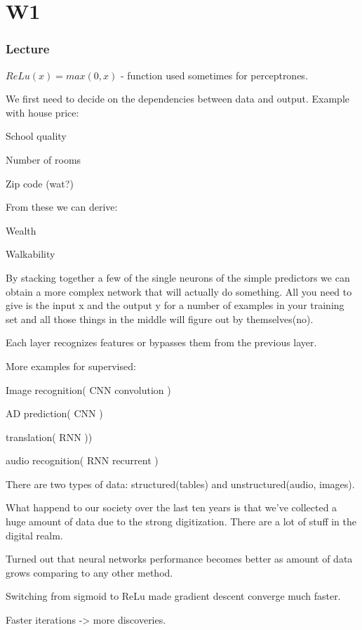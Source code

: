 \documentclass[a4paper,12pt]{article}
\begin{document}
\section{W1}
\subsubsection{Lecture}
$ReLu(x) = max(0,x)$ - function used sometimes for perceptrones.
\par
We first need to decide on the dependencies between data and output.
Example with house price:
\begin{list}{•}{}
\item School quality
\item Number of rooms
\item Zip code (wat?)
\end{list}
From these we can derive:
\begin{list}{•}{}
\item Wealth
\item Walkability
\end{list}
\par By stacking together a few of the single neurons of the simple predictors we can obtain
a more complex network that will actually do something. All you need to give is the input x and the output y for a number of examples in  your training set and all those things in the middle will figure out by themselves(no).
\par Each layer recognizes features or bypasses them from the previous layer.
\par More examples for supervised:
\begin{list}{•}{}
\item Image recognition( CNN convolution )
\item AD prediction( CNN )
\item translation( RNN ))
\item audio recognition( RNN recurrent )
\end{list}
\par There are two types of data: structured(tables) and unstructured(audio, images).
\par What happend to our society over the last ten years is that we've collected a huge amount of data due to the strong digitization. There are a lot of stuff in the digital realm.
\par Turned out that neural networks performance becomes better as amount of data grows comparing to any other method.
\par Switching from sigmoid to ReLu made gradient descent converge much faster.
\par Faster iterations -> more discoveries.
\end{document}
